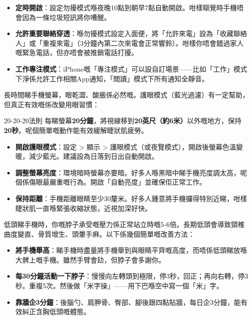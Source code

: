 \begin{itemize}
  \item \textbf{定時開啟}：設定勿擾模式喺夜晚10點到朝早7點自動開啟。咁樣瞓覺時手機唔會因為一條垃圾短訊將你嘈醒。
  \item \textbf{允許重要聯絡穿透}：喺勿擾模式設定入面便，將「允許來電」設為「收藏聯絡人」或「重複來電」（3分鐘內第二次來電會正常響鈴）。咁樣你唔會錯過家人嘅緊急電話，但亦唔會被推銷電話打擾。
  \item \textbf{工作專注模式}：iPhone嘅「專注模式」可以設自訂場景——比如「工作」模式下淨係允許工作相關App通知，「閲讀」模式下所有通知全靜音。
\end{itemize}


長時間睇手機螢幕，眼乾澀、酸脹係必然嘅。護眼模式（藍光過濾）有一定幫助，但真正有效嘅係改變用眼習慣：

\begin{tcbinfo}{20-20-20法則}
每睇螢幕\textbf{20分鐘}，將視線移到\textbf{20英尺（約6米）}以外嘅地方，保持\textbf{20秒}。呢個簡單嘅動作能有效緩解睫狀肌疲勞。

\end{tcbinfo}

\begin{itemize}
  \item \textbf{開啟護眼模式}：設定 > 顯示 > 護眼模式（或夜覽模式），開啟後螢幕色溫變暖，減少藍光。建議設為日落到日出自動開啟。
  \item \textbf{調整螢幕亮度}：環境暗時螢幕亦要暗。好多人喺黑暗中睇手機亮度調太高，呢個係傷眼最嚴重嘅行為。開啟「自動亮度」並確保佢正常工作。
  \item \textbf{保持距離}：手機距離眼睛至少30釐米。好多人鍾意將手機攞得特別近睇，咁樣睫狀肌一直喺緊張收縮狀態，近視加深好快。
\end{itemize}


低頭睇手機時，你嘅脖子承受嘅壓力係正常站立時嘅5-6倍。長期低頭會導致頸椎曲度變直、骨質增生、頭暈手麻。以下係幾個簡單嘅改善方法：

\begin{itemize}
  \item \textbf{將手機舉高}：睇手機時盡量將手機舉到與眼睛平齊嘅高度，而唔係低頭睇放喺大髀上嘅手機。雖然手臂會攰，但脖子會多謝你。
  \item \textbf{每30分鐘活動一下脖子}：慢慢向左轉頭到極限，停3秒，回正；再向右轉，停3秒。重複5次。然後做「米字操」——用下巴喺空中寫一個「米」字。
  \item \textbf{靠牆企3分鐘}：後腦勺、肩胛骨、臀部、腳後跟四點貼牆，每日企3分鐘，能有效糾正含胸低頭嘅體態。
\end{itemize}

